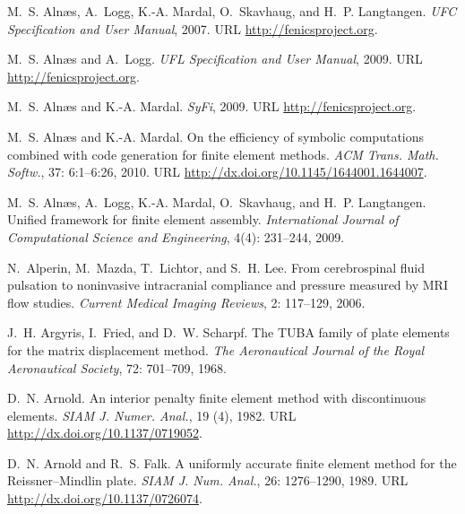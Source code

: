 \begin{thebibliography}{467}
M.~S. Aln\ae{}s, A.~Logg, K.-A. Mardal, O.~Skavhaug, and H.~P. Langtangen.
\newblock \emph{{UFC} Specification and User Manual}, 2007.
\newblock URL \url{http://fenicsproject.org}.

M.~S. Aln\ae{}s and A.~Logg.
\newblock \emph{{UFL} Specification and User Manual}, 2009.
\newblock URL \url{http://fenicsproject.org}.

M.~S. Aln{\ae}s and K.-A. Mardal.
\newblock \emph{{SyFi}}, 2009.
\newblock URL \url{http://fenicsproject.org}.

M.~S. Aln{\ae}s and K.-A. Mardal.
\newblock On the efficiency of symbolic computations combined with code
  generation for finite element methods.
\newblock \emph{ACM Trans. Math. Softw.}, 37: 6:1--6:26, 2010.
\newblock URL \url{http://dx.doi.org/10.1145/1644001.1644007}.

M.~S. Aln\ae{}s, A.~Logg, K.-A. Mardal, O.~Skavhaug, and H.~P. Langtangen.
\newblock Unified framework for finite element assembly.
\newblock \emph{International Journal of Computational Science and
  Engineering}, 4(4): 231--244, 2009.

N.~Alperin, M.~Mazda, T.~Lichtor, and S.~H. Lee.
\newblock From cerebrospinal fluid pulsation to noninvasive intracranial
  compliance and pressure measured by {MRI} flow studies.
\newblock \emph{Current Medical Imaging Reviews}, 2: 117--129, 2006.

J.~H. Argyris, I.~Fried, and D.~W. Scharpf.
\newblock The {TUBA} family of plate elements for the matrix displacement
  method.
\newblock \emph{The Aeronautical Journal of the Royal Aeronautical Society},
  72: 701--709, 1968.

D.~N. Arnold.
\newblock An interior penalty finite element method with discontinuous
  elements.
\newblock \emph{SIAM J. Numer. Anal.}, 19 (4), 1982.
\newblock URL \url{http://dx.doi.org/10.1137/0719052}.

D.~N. Arnold and R.~S. Falk.
\newblock A uniformly accurate finite element method for the
  {R}eissner--{M}indlin plate.
\newblock \emph{SIAM J. Num. Anal.}, 26: 1276--1290, 1989.
\newblock URL \url{http://dx.doi.org/10.1137/0726074}.


\end{thebibliography}
